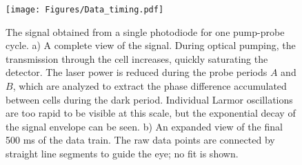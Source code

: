 \documentclass [10pt, twoside] {uwthesis}[2012/04/02]
\begin{document}
\begin{figure}
\begin{center}
\texttt{[image: Figures/Data\_timing.pdf]}
\end{center}
\caption[Single cell polarization rotation signal for one pump-probe cycle]
{\narrower The signal obtained from a single photodiode for one pump-probe cycle. a) A complete view of the signal. During optical pumping, the transmission through the cell increases, quickly saturating the detector. The laser power is reduced during the probe periods $A$ and $B$, which are analyzed to extract the phase difference accumulated between cells during the dark period. Individual Larmor oscillations are too rapid to be visible at this scale, but the exponential decay of the signal envelope can be seen. b) An expanded view of the final 500 ms of the data train. The raw data points are connected by straight line segments to guide the eye; no fit is shown.}
\label{Data_timimg}
\end{figure}
\end{document}
